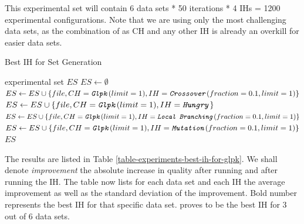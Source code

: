 This experimental set will contain 6 data sets * 50 iterations * 4 IHs = 1200 experimental configurations. Note that we are using only the most challenging data sets, as the combination of  as CH and any other IH is already an overkill for easier data sets.\\

\begin{algorithm}
\caption{Best IH for  Set Generation}
\label{listing-experiment-best-ih-for-glpk}
\begin{algorithmic}
\ENSURE experimental set $ES$
\STATE $ES \gets \emptyset$
    	\STATE $ES \gets ES \cup \{file, CH = \texttt{\textit{Glpk}}(limit = 1), IH = \texttt{\textit{Crossover}}(fraction = 0.1, limit = 1)\}$
    	\STATE $ES \gets ES \cup \{file, CH = \texttt{\textit{Glpk}}(limit = 1), IH = \texttt{\textit{Hungry}}\}$
    	\STATE $ES \gets ES \cup \{file, CH = \texttt{\textit{Glpk}}(limit = 1), IH = \texttt{\textit{Local Branching}}(fraction = 0.1, limit = 1)\}$
    	\STATE $ES \gets ES \cup \{file, CH = \texttt{\textit{Glpk}}(limit = 1), IH = \texttt{\textit{Mutation}}(fraction = 0.1, limit = 1)\}$
  \ENDFOR
\ENDFOR
\RETURN $ES$
\end{algorithmic}
\end{algorithm}

The results are listed in Table \ref{table-experiments-best-ih-for-glpk}. We shall denote \textit{improvement} the absolute increase in quality after running  and after running the IH. The table now lists for each data set and each IH the average improvement as well as the standard deviation of the improvement. Bold number represents the best IH for that specific data set.  proves to be the best IH for 3 out of 6 data sets.

